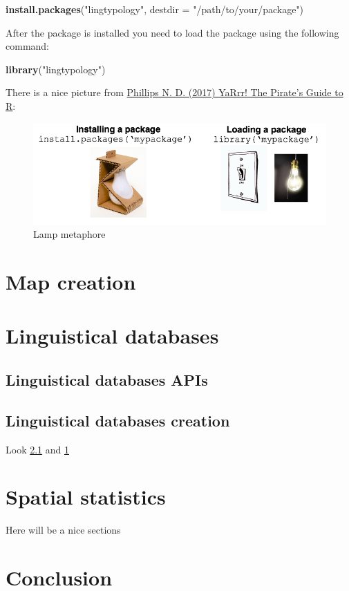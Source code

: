 \documentclass[]{book}
\newenvironment{Shaded}{\begin{snugshade}}{\end{snugshade}}
\newcommand{\KeywordTok}[1]{\textcolor[rgb]{0.13,0.29,0.53}{\textbf{#1}}}
\newcommand{\DataTypeTok}[1]{\textcolor[rgb]{0.13,0.29,0.53}{#1}}
\newcommand{\StringTok}[1]{\textcolor[rgb]{0.31,0.60,0.02}{#1}}
\newcommand{\NormalTok}[1]{#1}
\theoremstyle{definition}
\theoremstyle{definition}
\theoremstyle{definition}
\theoremstyle{remark}
\begin{document}
\begin{Shaded}
\begin{Highlighting}[]
\KeywordTok{install.packages}\NormalTok{(}\StringTok{"lingtypology"}\NormalTok{,}
                 \DataTypeTok{destdir =} \StringTok{"/path/to/your/package"}\NormalTok{)}
\end{Highlighting}
\end{Shaded}

After the package is installed you need to load the package using the
following command:

\begin{Shaded}
\begin{Highlighting}[]
\KeywordTok{library}\NormalTok{(}\StringTok{"lingtypology"}\NormalTok{)}
\end{Highlighting}
\end{Shaded}

There is a nice picture from
\href{https://bookdown.org/ndphillips/YaRrr/}{Phillips N. D. (2017)
YaRrr! The Pirate's Guide to R}:

\begin{figure}

{\centering \includegraphics[width=6.89in]{images/02-package} 

}

\caption{Lamp metaphore}\label{fig:lamp}
\end{figure}

\chapter{Map creation}\label{map-creation}

\chapter{Linguistical databases}\label{db}

\section{Linguistical databases APIs}\label{api}

\section{Linguistical databases creation}\label{db-creation}

Look \ref{api} and \ref{map-creation}

\chapter{Spatial statistics}\label{statistics}

Here will be a nice sections

\chapter{Conclusion}\label{conclusion}


\end{document}
